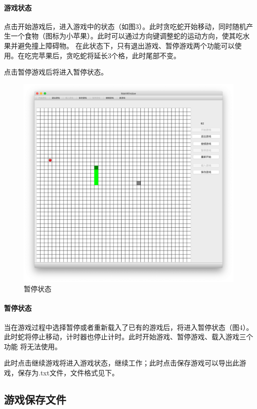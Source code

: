 \documentclass[utf-8]{ctexart}
\begin{document}
    \paragraph{游戏状态} 点击开始游戏后，进入游戏中的状态（如图3）。此时贪吃蛇开始移动，同时随机产生一个食物（图标为小苹果）。此时可以通过方向键调整蛇的运动方向，使其吃水果并避免撞上障碍物。
    在此状态下，只有退出游戏、暂停游戏两个功能可以使用。在吃完苹果后，贪吃蛇将延长3个格，此时尾部不变。
    \par 点击暂停游戏后将进入暂停状态。

    \begin{figure}[htb]
        \centering
        \includegraphics[scale = 0.2]{texsrc/界面paused.png}
        \caption{暂停状态}
        \label{paused}
    \end{figure}
    \paragraph{暂停状态} 当在游戏过程中选择暂停或者重新载入了已有的游戏后，将进入暂停状态（图4）。此时蛇将停止移动，计时器也停止计时。此时开始游戏、暂停游戏、载入游戏三个功能
    将无法使用。
    \par 此时点击继续游戏将进入游戏状态，继续工作；此时点击保存游戏可以导出此游戏，保存为.txt文件，文件格式见下。

    \subsection{游戏保存文件}
\end{document}
